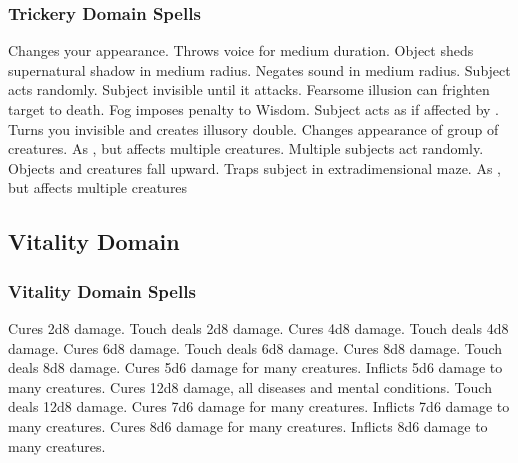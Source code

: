 \subsubsection{Trickery Domain Spells}
\begin{spelllist}
   Changes your appearance.
   Throws voice for medium duration.
   Object sheds supernatural shadow in medium radius.
   Negates sound in medium radius.
   Subject acts randomly.
   Subject invisible until it attacks.
  \spellhead[4]{}
   Fearsome illusion can frighten target to death.
   Fog imposes  penalty to Wisdom.
   Subject acts as if affected by .
   Turns you invisible and creates illusory double.
   Changes appearance of group of creatures.
   As , but affects multiple creatures.
   Multiple subjects act randomly.
  \spellhead[8]{}
   Objects and creatures fall upward.
   Traps subject in extradimensional maze.
   As , but affects multiple creatures
\end{spelllist}

\subsection{Vitality Domain}
\subsubsection{Vitality Domain Spells}
\begin{spelllist}
   Cures 2d8 damage.
   Touch deals 2d8 damage.
   Cures 4d8 damage.
   Touch deals 4d8 damage.
   Cures 6d8 damage.
   Touch deals 6d8 damage.
   Cures 8d8 damage.
   Touch deals 8d8 damage.
   Cures 5d6 damage for many creatures.
   Inflicts 5d6 damage to many creatures.
   Cures 12d8 damage, all diseases and mental conditions.
   Touch deals 12d8 damage.
   Cures 7d6 damage for many creatures.
   Inflicts 7d6 damage to many creatures.
   Cures 8d6 damage for many creatures.
   Inflicts 8d6 damage to many creatures.
  \spellhead[9]{}
  \spellhead[9]{}
\end{spelllist}

